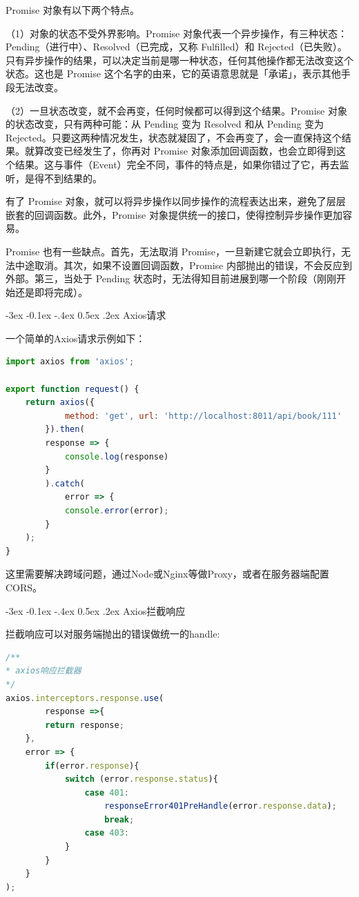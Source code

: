 \documentclass[12pt]{book}
\makeatletter
\numberwithin{dummy}{section}
\theoremstyle{ocrenumbox}
\theoremstyle{blacknumex}
\theoremstyle{blacknumbox}
\theoremstyle{ocrenum}
\renewcommand{\subsection}{\@startsection {subsection}{2}{\z@}
	{-3ex \@plus -0.1ex \@minus -.4ex}
	{0.5ex \@plus.2ex }
	{\normalfont\sffamily\bfseries}}
\newlength\esp
\makeatother
\begin{document}
Promise 对象有以下两个特点。

（1）对象的状态不受外界影响。Promise 对象代表一个异步操作，有三种状态：Pending（进行中）、Resolved（已完成，又称 Fulfilled）和 Rejected（已失败）。只有异步操作的结果，可以决定当前是哪一种状态，任何其他操作都无法改变这个状态。这也是 Promise 这个名字的由来，它的英语意思就是「承诺」，表示其他手段无法改变。

（2）一旦状态改变，就不会再变，任何时候都可以得到这个结果。Promise 对象的状态改变，只有两种可能：从 Pending 变为 Resolved 和从 Pending 变为 Rejected。只要这两种情况发生，状态就凝固了，不会再变了，会一直保持这个结果。就算改变已经发生了，你再对 Promise 对象添加回调函数，也会立即得到这个结果。这与事件（Event）完全不同，事件的特点是，如果你错过了它，再去监听，是得不到结果的。

有了 Promise 对象，就可以将异步操作以同步操作的流程表达出来，避免了层层嵌套的回调函数。此外，Promise 对象提供统一的接口，使得控制异步操作更加容易。

Promise 也有一些缺点。首先，无法取消 Promise，一旦新建它就会立即执行，无法中途取消。其次，如果不设置回调函数，Promise 内部抛出的错误，不会反应到外部。第三，当处于 Pending 状态时，无法得知目前进展到哪一个阶段（刚刚开始还是即将完成）。

\subsection{Axios请求}

一个简单的Axios请求示例如下：

\begin{lstlisting}[language=JavaScript]
import axios from 'axios';

export function request() {
	return axios({
			method: 'get', url: 'http://localhost:8011/api/book/111'
		}).then(
		response => {
			console.log(response)
		}
		).catch(
			error => {
			console.error(error);
		}
	);
}
\end{lstlisting}


这里需要解决跨域问题，通过Node或Nginx等做Proxy，或者在服务器端配置CORS。

\subsection{Axios拦截响应}

拦截响应可以对服务端抛出的错误做统一的handle:

\begin{lstlisting}[language=JavaScript]
/**
* axios响应拦截器
*/
axios.interceptors.response.use(
		response =>{
		return response;
	},
	error => {
		if(error.response){
			switch (error.response.status){
				case 401:
					responseError401PreHandle(error.response.data);
					break;
				case 403:
			}
		}
	}
);
\end{lstlisting}
\end{document}
